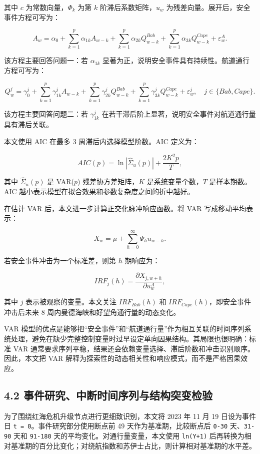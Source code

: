 \documentclass[
]{ctexart}
\begin{document}
其中 \(c\) 为常数向量，\(\Phi_k\) 为第 \(k\) 阶滞后系数矩阵，\(u_w\)
为残差向量。展开后，安全事件方程可写为：

\[
A_w=\alpha_0+\sum_{k=1}^{p}\alpha_{1k}A_{w-k}
+\sum_{k=1}^{p}\alpha_{2k}Q^{Bab}_{w-k}
+\sum_{k=1}^{p}\alpha_{3k}Q^{Cape}_{w-k}
+\varepsilon^A_w.
\]

该方程主要回答问题一：若 \(\alpha_{1k}\)
显著为正，说明安全事件具有持续性。航道通行方程可写为：

\[
Q^j_w=\gamma^j_0+\sum_{k=1}^{p}\gamma^j_{1k}A_{w-k}
+\sum_{k=1}^{p}\gamma^j_{2k}Q^{Bab}_{w-k}
+\sum_{k=1}^{p}\gamma^j_{3k}Q^{Cape}_{w-k}
+\varepsilon^j_w,\quad j\in\{Bab,Cape\}.
\]

该方程主要回答问题二：若 \(\gamma^j_{1k}\)
在若干滞后阶上显著，说明安全事件对航道通行量具有滞后关联。

本文使用 AIC 在最多 3 周滞后内选择模型阶数。AIC 定义为：

\[
AIC(p)=\ln|\hat{\Sigma}_u(p)|+\frac{2K^2p}{T},
\]

其中 \(\hat{\Sigma}_u(p)\) 是 VAR(\(p\)) 残差协方差矩阵，\(K\)
是系统变量个数，\(T\) 是样本期数。AIC
越小表示模型在拟合效果和参数复杂度之间的折中越好。

在估计 VAR 后，本文进一步计算正交化脉冲响应函数。将 VAR
写成移动平均表示：

\[
X_w=\mu+\sum_{h=0}^{\infty}\Psi_h u_{w-h}.
\]

若安全事件冲击为一个标准差，则第 \(h\) 期响应为：

\[
IRF_j(h)=\frac{\partial X_{j,w+h}}{\partial u^A_w},
\]

其中 \(j\) 表示被观察的变量。本文关注 \(IRF_{Bab}(h)\) 和
\(IRF_{Cape}(h)\)，即安全事件冲击后未来 8
周内曼德海峡和好望角通行量的动态变化。

VAR
模型的优点是能够把``安全事件''和``航道通行量''作为相互关联的时间序列系统处理，避免在缺少完整控制变量时过早设定单向因果结构。其局限也很明确：标准
VAR
通常要求序列平稳，结果还会依赖变量选择、滞后阶数和冲击识别顺序。因此，本文把
VAR 解释为探索性的动态相关性和响应模式，而不是严格因果效应。

\subsection{4.2
事件研究、中断时间序列与结构突变检验}\label{ux4e8bux4ef6ux7814ux7a76ux4e2dux65adux65f6ux95f4ux5e8fux5217ux4e0eux7ed3ux6784ux7a81ux53d8ux68c0ux9a8c}

为了围绕红海危机升级节点进行更细致识别，本文将 2023 年 11 月 19
日设为事件日 \texttt{t\ =\ 0}。事件研究部分使用断点前 49
天作为基准期，比较断点后 \texttt{0-30} 天、\texttt{31-90} 天和
\texttt{91-180} 天的平均变化。对通行量变量，本文使用 \texttt{ln(Y+1)}
后再转换为相对基准期的百分比变化；对绕航指数和苏伊士占比，则计算相对基准期的水平差。
\end{document}
